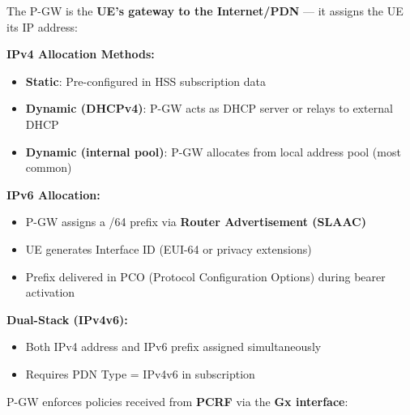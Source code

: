 

\CNchained{}

The P-GW is the \textbf{UE’s gateway to the Internet/\allowbreak{}PDN} — it assigns the UE its IP address:

\textbf{IPv4 Allocation Methods:}

\begin{itemize}
\tightlist
\item
  \textbf{Static}: Pre-configured in HSS subscription data
\item
  \textbf{Dynamic (DHCPv4)}: P-GW acts as DHCP server or relays to external DHCP
\item
  \textbf{Dynamic (internal pool)}: P-GW allocates from local address pool (most common)
\end{itemize}

\textbf{IPv6 Allocation:}

\begin{itemize}
\tightlist
\item
  P-GW assigns a /\allowbreak{}64 prefix via \textbf{Router Advertisement (SLAAC)}
\item
  UE generates Interface ID (EUI-64 or privacy extensions)
\item
  Prefix delivered in PCO (Protocol Configuration Options) during bearer activation
\end{itemize}

\textbf{Dual-Stack (IPv4v6):}

\begin{itemize}
\tightlist
\item
  Both IPv4 address and IPv6 prefix assigned simultaneously
\item
  Requires PDN Type = IPv4v6 in subscription
\end{itemize}


P-GW enforces policies received from \textbf{PCRF} via the \textbf{Gx interface}:

